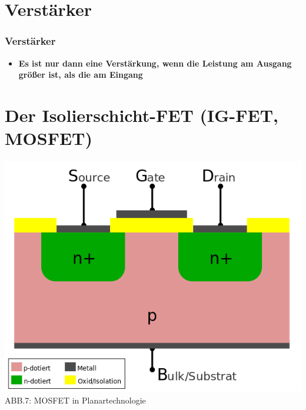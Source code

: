 \section{Verstärker}
\begin{frame}
\frametitle{Verstärker}
\begin{center}
\begin{Large}
\begin{itemize}
	\item \textbf{Es ist nur dann eine Verstärkung, wenn die Leistung am Ausgang größer ist, als die am Eingang}

\end{itemize}
\end{Large}
\end{center}
\end{frame}

\section*{Der Isolierschicht-FET (IG-FET, MOSFET)}
\begin{frame}
	\begin{center}
		\includegraphics[scale=0.4 ]{a06/Isolierschicht-FET-intern.png}\\
		ABB.7: MOSFET in Planartechnologie \cite{wmde}
	\end{center}
\end{frame}

